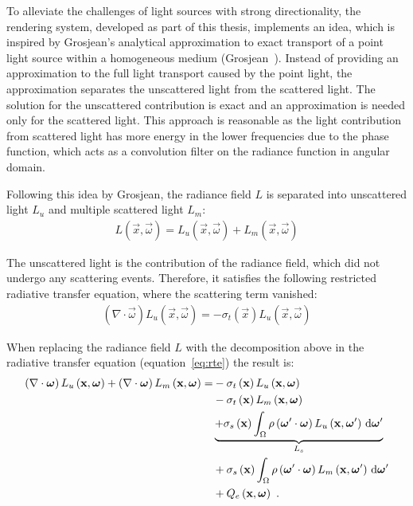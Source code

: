 To alleviate the challenges of light sources with strong directionality, the rendering system, developed as part of this thesis, implements an idea, which is inspired by Grosjean’s analytical approximation to exact transport of a point light source within a homogeneous medium (Grosjean~\cite{Grosjean56}). Instead of providing an approximation to the full light transport caused by the point light, the approximation separates the unscattered light from the scattered light. The solution for the unscattered contribution is exact and an approximation is needed only for the scattered light. This approach is reasonable as the light contribution from scattered light has more energy in the lower frequencies due to the phase function, which acts as a convolution filter on the radiance function in angular domain.

Following this idea by Grosjean, the radiance field $L$ is separated into unscattered light $L_{u}$ and multiple scattered light $L_m$:
\begin{align}
L\left(\vec{x}, \vec{\omega}\right) = 
L_u\left(\vec{x}, \vec{\omega}\right)
+L_m\left(\vec{x}, \vec{\omega}\right)
\end{align}

The unscattered light is the contribution of the radiance field, which did not undergo any scattering events. Therefore, it satisfies the following restricted radiative transfer equation, where the scattering term vanished:
\begin{align}
\left(\nabla\cdot\vec{\omega}\right)L_u\left(\vec{x}, \vec{\omega} \right)
=
-\sigma_t\left(\vec{x}\right) L_u\left(\vec{x}, \vec{\omega} \right)
\label{eq:restricted_rte}
\end{align}


When replacing the radiance field $L$ with the decomposition above in the radiative transfer equation (equation~\ref{eq:rte}) the result is:
\begin{align}
\left(\nabla\cdot\boldsymbol{\mathbf{\omega}}\right)L_u\left(\boldsymbol{\mathbf{x}}, \boldsymbol{\mathbf{\omega}} \right)
+\left(\nabla\cdot\boldsymbol{\mathbf{\omega}}\right)L_m\left(\boldsymbol{\mathbf{x}}, \boldsymbol{\mathbf{\omega}} \right)
=&
-\sigma_t\left(\boldsymbol{\mathbf{x}}\right) L_u\left(\boldsymbol{\mathbf{x}}, \boldsymbol{\mathbf{\omega}} \right)
\nonumber\\
&
-\sigma_t\left(\boldsymbol{\mathbf{x}}\right) L_m\left(\boldsymbol{\mathbf{x}}, \boldsymbol{\mathbf{\omega}} \right)\nonumber\\
&
\underbrace
{
+\sigma_s\left(\boldsymbol{\mathbf{x}}\right) \int_{\Omega}
{
\rho\left(\boldsymbol{\mathbf{\omega}}'\cdot\boldsymbol{\mathbf{\omega}}\right)L_u\left(\boldsymbol{\mathbf{x}}, \boldsymbol{\mathbf{\omega}}' \right)\,\mathrm{d}\boldsymbol{\mathbf{\omega}}'
}
}_{L_s}
\nonumber\\
&
+\sigma_s\left(\boldsymbol{\mathbf{x}}\right) \int_{\Omega}
{
\rho\left(\boldsymbol{\mathbf{\omega}}'\cdot\boldsymbol{\mathbf{\omega}}\right)L_m\left(\boldsymbol{\mathbf{x}}, \boldsymbol{\mathbf{\omega}}' \right)\,\mathrm{d}\boldsymbol{\mathbf{\omega}}'
}
\nonumber
\\
&
+Q_e\left(\boldsymbol{\mathbf{x}}, \boldsymbol{\mathbf{\omega}}\right)
\nonumber
\  .
\end{align}

